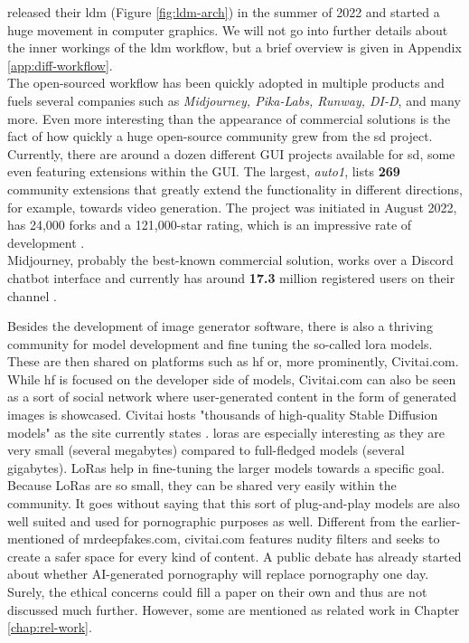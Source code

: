 \documentclass[
  a4paper,  %
  twoside,  %
  bibliography=totoc,
  headsepline,
  cleardoublepage=empty,
  parskip=half,
  draft=false
]{scrbook}
\begin{document}
\citet{rombachHighResolutionImageSynthesis2022} released their \gls{ldm} (Figure \ref{fig:ldm-arch}) in the summer of 2022 and started a huge movement in computer graphics. We will not go into further details about the inner workings of the \gls{ldm} workflow, but a brief overview is given in Appendix \ref{app:diff-workflow}.\\
The open-sourced workflow has been quickly adopted in multiple products and fuels several companies such as \textit{Midjourney, Pika-Labs, Runway, DI-D}, and many more. Even more interesting than the appearance of commercial solutions is the fact of how quickly a huge open-source community grew from the \gls{sd} project. Currently, there are around a dozen different GUI projects available for \gls{sd}, some even featuring extensions within the GUI. The largest, \textit{\gls{auto1}}, lists \textbf{269} community extensions that greatly extend the functionality in different directions, for example, towards video generation. The project was initiated in August 2022, has 24,000 forks and a 121,000-star rating, which is an impressive rate of development \cite{AUTOMATIC1111StablediffusionwebuiStable}. \\
Midjourney, probably the best-known commercial solution, works over a Discord chatbot interface and currently has around \textbf{17.3} million registered users on their channel \cite{midjourneyJoinMidjourneyDiscord}.

Besides the development of image generator software, there is also a thriving community for model development and fine tuning the so-called \gls{lora} models. These are then shared on platforms such as \gls{hf} or, more prominently, Civitai.com. While \gls{hf} is focused on the developer side of models, Civitai.com can also be seen as a sort of social network where user-generated content in the form of generated images is showcased. Civitai hosts "thousands of high-quality Stable Diffusion models" as the site currently states \cite{CivitaiHomeOpenSource}. \gls{lora}s are especially interesting as they are very small (several megabytes) compared to full-fledged models (several gigabytes). LoRas help in fine-tuning the larger models towards a specific goal. Because LoRas are so small, they can be shared very easily within the community. It goes without saying that this sort of plug-and-play models are also well suited and used for pornographic purposes as well. Different from the earlier-mentioned of mrdeepfakes.com, civitai.com features nudity filters and seeks to create a safer space for every kind of content. A public debate has already started about whether AI-generated pornography will replace pornography one day. Surely, the ethical concerns could fill a paper on their own and thus are not discussed much further. However, some are mentioned as related work in Chapter \ref{chap:rel-work}.
\end{document}
